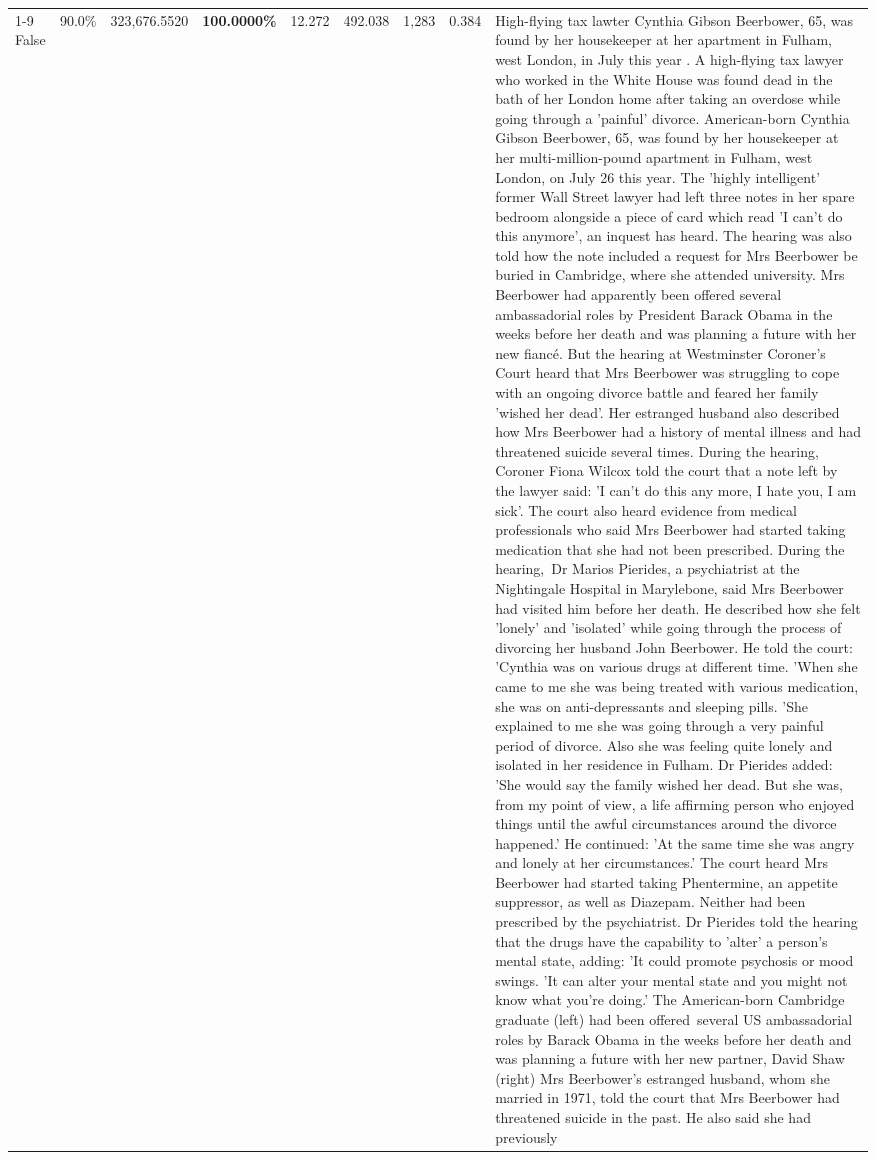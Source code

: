 \begin{table}[H]
\begin{tabular}{lllrlllll}
\cline{1-9}
False & 90.0\% & 323,676.5520 & \bfseries \color{red} 100.0000\% & 12.272 & 492.038 & 1,283 & 0.384 & High-flying tax lawter Cynthia Gibson Beerbower, 65, was found by her housekeeper at her apartment in Fulham, west London, in July this year . A high-flying tax lawyer who worked in the White House was found dead in the bath of her London home after taking an overdose while going through a 'painful' divorce. American-born Cynthia Gibson Beerbower, 65, was found by her housekeeper at her multi-million-pound apartment in Fulham, west London, on July 26 this year. The 'highly intelligent' former Wall Street lawyer had left three notes in her spare bedroom alongside a piece of card which read 'I can't do this anymore', an inquest has heard. The hearing was also told how the note included a request for Mrs Beerbower be buried in Cambridge, where she attended university. Mrs Beerbower had apparently been offered several ambassadorial roles by President Barack Obama in the weeks before her death and was planning a future with her new fiancé. But the hearing at Westminster Coroner's Court heard that Mrs Beerbower was struggling to cope with an ongoing divorce battle and feared her family 'wished her dead'. Her estranged husband also described how Mrs Beerbower had a history of mental illness and had threatened suicide several times. During the hearing, Coroner Fiona Wilcox told the court that a note left by the lawyer said: 'I can't do this any more, I hate you, I am sick'. The court also heard evidence from medical professionals who said Mrs Beerbower had started taking medication that she had not been prescribed. During the hearing, Dr Marios Pierides, a psychiatrist at the Nightingale Hospital in Marylebone, said Mrs Beerbower had visited him before her death. He described how she felt 'lonely' and 'isolated' while going through the process of divorcing her husband John Beerbower. He told the court: 'Cynthia was on various drugs at different time. 'When she came to me she was being treated with various medication, she was on anti-depressants and sleeping pills. 'She explained to me she was going through a very painful period of divorce. Also she was feeling quite lonely and isolated in her residence in Fulham. Dr Pierides added: 'She would say the family wished her dead. But she was, from my point of view, a life affirming person who enjoyed things until the awful circumstances around the divorce happened.' He continued: 'At the same time she was angry and lonely at her circumstances.' The court heard Mrs Beerbower had started taking Phentermine, an appetite suppressor, as well as Diazepam. Neither had been prescribed by the psychiatrist. Dr Pierides told the hearing that the drugs have the capability to 'alter' a person's mental state, adding: 'It could promote psychosis or mood swings. 'It can alter your mental state and you might not know what you're doing.' The American-born Cambridge graduate (left) had been offered several US ambassadorial roles by Barack Obama in the weeks before her death and was planning a future with her new partner, David Shaw (right) Mrs Beerbower's estranged husband, whom she married in 1971, told the court that Mrs Beerbower had threatened suicide in the past. He also said she had previously 
\end{tabular}
\end{table}
